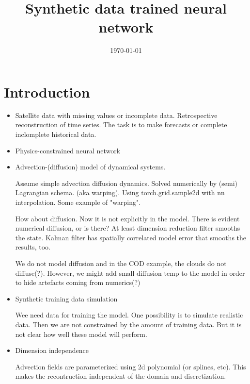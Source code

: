 \documentclass[a4paper,12pt]{article}
\title{Synthetic data trained neural network}
\author{}
\date{\today}
\begin{document}
\maketitle

\begin{abstract}
\end{abstract}

\section{Introduction}

\begin{itemize}
\item
    Satellite data with missing values or incomplete data. Retrospective reconstruction of time series. The task is to make forecasts or complete inclomplete historical data.

    \item
        Physics-constrained neural network
    \item
        Advection-(diffusion) model of dynamical systems.

        Assume simple advection diffusion dynamics. Solved numerically by (semi) Lagrangian schema. (aka warping). Using torch.grid.sample2d with nn interpolation. Some example of "warping".

        How about diffusion. Now it is not explicitly in the model. There is evident numerical diffusion, or is there? At least dimension reduction filter smooths the state. Kalman filter has spatially correlated model error that smooths the results, too.

        We do not model diffusion and in the COD example, the clouds do not diffuse(?). However, we might add small diffusion temp to the model in order to hide artefacts coming from numerics(?)

    \item
        Synthetic training data simulation

        Wee need data for training the model. One possibility is to simulate realistic data. Then we are not constrained by the amount of training data. But it is not clear  how well these model will perform.

    \item
        Dimension independence

        Advection fields are parameterized using 2d polynomial (or splines, etc). This makes the recontruction independent of the domain and discretization.


\end{itemize}
\end{document}

